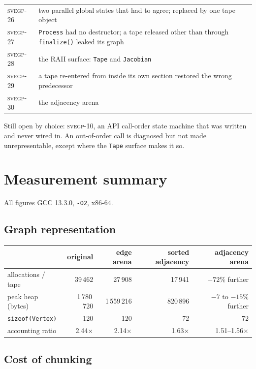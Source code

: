 \documentclass[11pt,a4paper]{report}
\newcommand{\svegp}[1]{\textsc{svegp-#1}}
\newcommand{\code}[1]{\texttt{#1}}
\begin{document}
\begin{center}
\begin{longtable}{@{}lp{12.4cm}@{}}
\svegp{26} & two parallel global states that had to agree; replaced by one tape object \\
\svegp{27} & \code{Process} had no destructor; a tape released other than through \code{finalize()} leaked its graph \\
\svegp{28} & the RAII surface: \code{Tape} and \code{Jacobian} \\
\svegp{29} & a tape re-entered from inside its own section restored the wrong predecessor \\
\svegp{30} & the adjacency arena \\
\bottomrule
\end{longtable}
\end{center}

\noindent
Still open by choice: \svegp{10}, an API call-order state machine that was
written and never wired in. An out-of-order call is diagnosed but not made
unrepresentable, except where the \code{Tape} surface makes it so.

\chapter{Measurement summary}

All figures GCC 13.3.0, \code{-O2}, x86-64.

\section{Graph representation}

\begin{center}
\begin{tabular}{@{}lrrrr@{}}
\toprule
 & original & edge arena & sorted adjacency & adjacency arena \\
\midrule
allocations / tape    & 39\,462 & 27\,908 & 17\,941 & $-72\%$ further \\
peak heap (bytes)     & 1\,780\,720 & 1\,559\,216 & 820\,896 & $-7$ to $-15\%$ further \\
\code{sizeof(Vertex)} & 120 & 120 & 72 & 72 \\
accounting ratio      & 2.44$\times$ & 2.14$\times$ & 1.63$\times$ & 1.51--1.56$\times$ \\
\bottomrule
\end{tabular}
\end{center}

\section{Cost of chunking}
\end{document}
